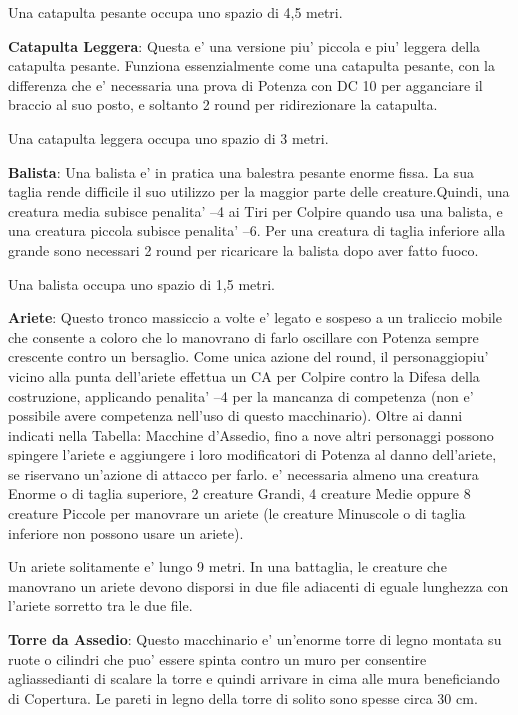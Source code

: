 \documentclass[a4paper,11pt,twoside,openany]{dndbook}
\begin{document}
{Una catapulta pesante occupa uno spazio di 4,5 metri.

\textbf{Catapulta Leggera}: Questa e' una versione piu' piccola e piu' leggera della catapulta pesante. Funziona essenzialmente come una catapulta pesante, con la differenza che e' necessaria una prova di Potenza con DC 10 per agganciare il braccio al suo posto, e soltanto 2 round per ridirezionare la catapulta.

Una catapulta leggera occupa uno spazio di 3 metri.

\textbf{Balista}: Una balista e' in pratica una balestra pesante enorme fissa. La sua taglia rende difficile il suo utilizzo per la maggior parte delle creature.Quindi, una creatura media subisce penalita' --4 ai Tiri per Colpire quando usa una balista, e una creatura piccola subisce penalita' --6. Per una creatura di taglia inferiore alla grande sono necessari 2 round per ricaricare la balista dopo aver fatto fuoco.

Una balista occupa uno spazio di 1,5 metri.

\textbf{Ariete}: Questo tronco massiccio a volte e' legato e sospeso a un traliccio mobile che consente a coloro che lo manovrano di farlo oscillare con Potenza sempre crescente contro un bersaglio. Come unica azione del round, il personaggiopiu' vicino alla punta dell'ariete effettua un CA per Colpire contro la Difesa della costruzione, applicando penalita' --4 per la mancanza di competenza (non e' possibile avere competenza nell'uso di questo macchinario). Oltre ai danni indicati nella Tabella: Macchine d'Assedio, fino a nove altri personaggi possono spingere l'ariete e aggiungere i loro modificatori di Potenza al danno dell'ariete, se riservano un'azione di attacco per farlo. e' necessaria almeno una creatura Enorme o di taglia superiore, 2 creature Grandi, 4 creature Medie oppure 8 creature Piccole per manovrare un ariete (le creature Minuscole o di taglia inferiore non possono usare un ariete).

Un ariete solitamente e' lungo 9 metri. In una battaglia, le creature che manovrano un ariete devono disporsi in due file adiacenti di eguale lunghezza con l'ariete sorretto tra le due file. 

\textbf{Torre da Assedio}: Questo macchinario e' un'enorme torre di legno montata su ruote o cilindri che puo' essere spinta contro un muro per consentire agliassedianti di scalare la torre e quindi arrivare in cima alle mura beneficiando di Copertura. Le pareti in legno della torre di solito sono spesse circa 30 cm.

}
\end{document}
